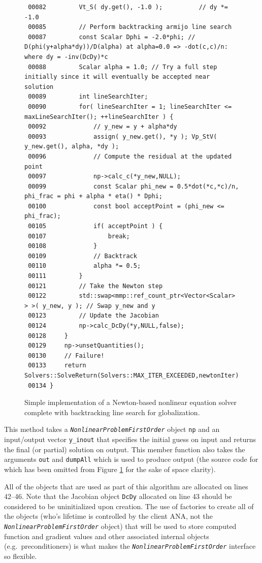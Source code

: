 {\begin{figure}
\begin{minipage}{\textwidth}
{\begin{verbatim}
 00082         Vt_S( dy.get(), -1.0 );          // dy *= -1.0
 00085         // Perform backtracking armijo line search
 00087         const Scalar Dphi = -2.0*phi; // D(phi(y+alpha*dy))/D(alpha) at alpha=0.0 => -dot(c,c)/n: where dy = -inv(DcDy)*c
 00088         Scalar alpha = 1.0; // Try a full step initially since it will eventually be accepted near solution
 00089         int lineSearchIter;
 00090         for( lineSearchIter = 1; lineSearchIter <= maxLineSearchIter(); ++lineSearchIter ) {
 00092             // y_new = y + alpha*dy
 00093             assign( y_new.get(), *y ); Vp_StV( y_new.get(), alpha, *dy );
 00096             // Compute the residual at the updated point
 00097             np->calc_c(*y_new,NULL);
 00099             const Scalar phi_new = 0.5*dot(*c,*c)/n, phi_frac = phi + alpha * eta() * Dphi;
 00100             const bool acceptPoint = (phi_new <= phi_frac);
 00105             if( acceptPoint ) {
 00107                 break;
 00108             }
 00109             // Backtrack
 00110             alpha *= 0.5;
 00111         }
 00121         // Take the Newton step
 00122         std::swap<mmp::ref_count_ptr<Vector<Scalar> > >( y_new, y ); // Swap y_new and y
 00123         // Update the Jacobian
 00124         np->calc_DcDy(*y,NULL,false);
 00128     }
 00129     np->unsetQuantities();
 00130     // Failure!
 00133     return Solvers::SolveReturn(Solvers::MAX_ITER_EXCEEDED,newtonIter);
 00134 }
\end{verbatim}}
\end{minipage}
\caption{
\label{tsfcore:nonlin:fig:newton_solver_code}
Simple implementation of a Newton-based nonlinear equation solver complete with
backtracking line search for globalization.
}
\end{figure}
\esinglespace}
%
This method takes a \texttt{\textit{Nonlinear\-Problem\-First\-Order}}
object \texttt{np} and an input/output vector \texttt{y\_inout} that
specifies the initial guess on input and returns the final (or
partial) solution on output.  This member function also takes the
arguments \texttt{out} and \texttt{dumpAll} which is used to produce
output (the source code for which has been omitted from Figure
\ref{tsfcore:nonlin:fig:newton_solver_code} for the sake of
space clarity).

All of the objects that are used as part of this algorithm are
allocated on lines 42--46.  Note that the Jacobian object
\texttt{DcDy} allocated on line 43 should be considered to be
uninitialized upon creation.  The use of factories to create all of
the objects (who's lifetime is controlled by the client ANA, not the
\texttt{\textit{Nonlinear\-Problem\-First\-Order}} object) that will
be used to store computed function and gradient values and other
associated internal objects (e.g.~preconditioners) is what makes the
\texttt{\textit{Nonlinear\-Problem\-First\-Order}} interface so
flexible.

